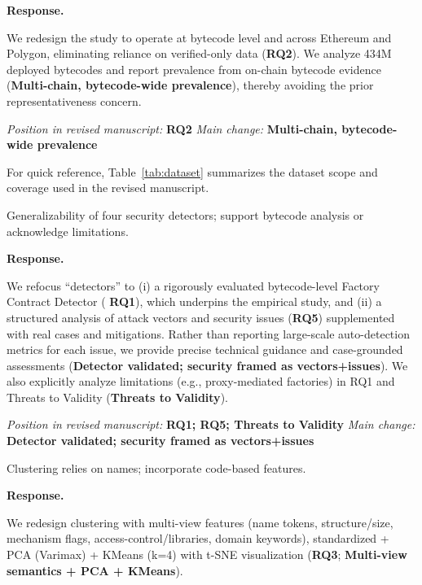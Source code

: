 \documentclass[acmsmall]{acmart}
\begin{document}
	\noindent
	\textbf{Response.}

	We redesign the study to operate at bytecode level and across Ethereum and Polygon, eliminating reliance
	on verified-only data ({\textbf{RQ2}}). We analyze 434M deployed bytecodes and report prevalence
	from on-chain bytecode evidence ({\textbf{Multi-chain, bytecode-wide prevalence}}), thereby avoiding
	the prior representativeness concern.

\noindent\textit{Position in revised manuscript:} {\color{red}\textbf{RQ2}}
\noindent\textit{Main change:} {\color{blue}\textbf{Multi-chain, bytecode-wide prevalence}}

	\vspace{0.25em}
	For quick reference, Table~\ref{tab:dataset} summarizes the dataset scope and coverage used in
	the revised manuscript.
	

	\begin{tcolorbox}
		[commentbox,title=Reviewer \#2 -- Comment 2] Generalizability of four security detectors;
		support bytecode analysis or acknowledge limitations.
	\end{tcolorbox}

	\noindent
	\textbf{Response.}

	We refocus “detectors” to (i) a rigorously evaluated bytecode-level Factory Contract Detector ( {\textbf{RQ1}}),
	which underpins the empirical study, and (ii) a structured analysis of attack vectors and
	security issues ({\textbf{RQ5}}) supplemented with real cases and mitigations. Rather than reporting
	large-scale auto-detection metrics for each issue, we provide precise technical guidance and
	case-grounded assessments ({\textbf{Detector validated; security framed as vectors+issues}}). We
	also explicitly analyze limitations (e.g., proxy-mediated factories) in RQ1 and Threats to Validity
	({\textbf{Threats to Validity}}).

\noindent\textit{Position in revised manuscript:} {\color{red}\textbf{RQ1; RQ5; Threats to Validity}}
\noindent\textit{Main change:} {\color{blue}\textbf{Detector validated; security framed as vectors+issues}}

	\begin{tcolorbox}
		[commentbox,title=Reviewer \#2 -- Comment 3] Clustering relies on names; incorporate code-based
		features.
	\end{tcolorbox}

	\noindent
	\textbf{Response.}

	We redesign clustering with multi-view features (name tokens, structure/size, mechanism flags,
	access-control/libraries, domain keywords), standardized + PCA (Varimax) + KMeans (k=4) with t-SNE
	visualization ({\textbf{RQ3}}; {\textbf{Multi-view semantics + PCA + KMeans}}).
\end{document}
